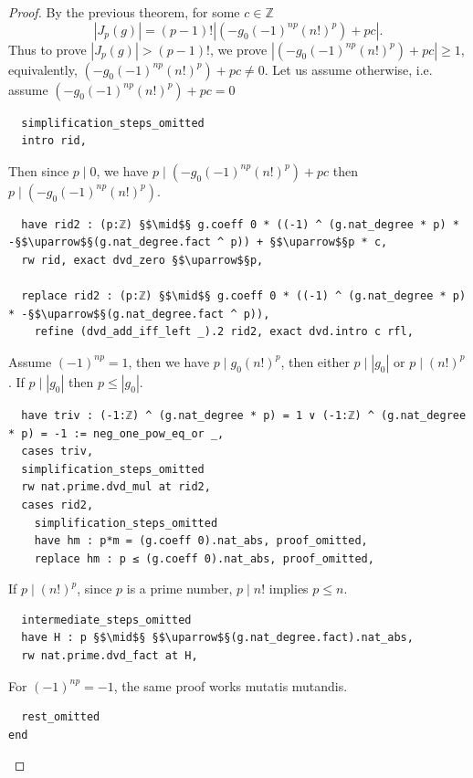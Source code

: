 \documentclass{report}
\theoremstyle{definition}
\begin{document}
\begin{proof}
By the previous theorem, for some $c\in\mathbb Z$
$$
|J_p(g)|=(p-1)!\left|(-g_0(-1)^{np}(n!)^p)+pc\right|.
$$
Thus to prove $|J_p(g)|>(p-1)!$, we prove $\left|(-g_0(-1)^{np}(n!)^p)+pc\right| \ge 1$, equivalently, $(-g_0(-1)^{np}(n!)^p)+pc\ne0$. Let us assume otherwise, i.e. assume $(-g_0(-1)^{np}(n!)^p)+pc=0$
\begin{verbatim}
  simplification_steps_omitted
  intro rid,
\end{verbatim}

Then since $p\mid 0$, we have $p\mid (-g_0(-1)^{np}(n!)^p)+pc$ then $p\mid(-g_0(-1)^{np}(n!)^p)$.
\begin{verbatim}
  have rid2 : (p:ℤ) §$\mid$§ g.coeff 0 * ((-1) ^ (g.nat_degree * p) * -§$\uparrow$§(g.nat_degree.fact ^ p)) + §$\uparrow$§p * c,
  rw rid, exact dvd_zero §$\uparrow$§p,
  
  replace rid2 : (p:ℤ) §$\mid$§ g.coeff 0 * ((-1) ^ (g.nat_degree * p) * -§$\uparrow$§(g.nat_degree.fact ^ p)),
    refine (dvd_add_iff_left _).2 rid2, exact dvd.intro c rfl,
\end{verbatim}

Assume $(-1)^{np}=1$, then we have $p\mid g_0 (n!)^p$, then either $p\mid |g_0|$ or $p\mid (n!)^p$. If $p\mid |g_0|$ then $p\le |g_0|$.
\begin{verbatim}
  have triv : (-1:ℤ) ^ (g.nat_degree * p) = 1 ∨ (-1:ℤ) ^ (g.nat_degree * p) = -1 := neg_one_pow_eq_or _,
  cases triv,
  simplification_steps_omitted
  rw nat.prime.dvd_mul at rid2,
  cases rid2,
    simplification_steps_omitted
    have hm : p*m = (g.coeff 0).nat_abs, proof_omitted,
    replace hm : p ≤ (g.coeff 0).nat_abs, proof_omitted,
\end{verbatim}

If $p\mid (n!)^p$, since $p$ is a prime number, $p\mid n!$  implies $p\le n$.
\begin{verbatim}
  intermediate_steps_omitted
  have H : p §$\mid$§ §$\uparrow$§(g.nat_degree.fact).nat_abs,
  rw nat.prime.dvd_fact at H,
\end{verbatim}

For $(-1)^{np}=-1$, the same proof works mutatis mutandis.
\begin{verbatim}
  rest_omitted
end
\end{verbatim}
\end{proof}
\end{document}
